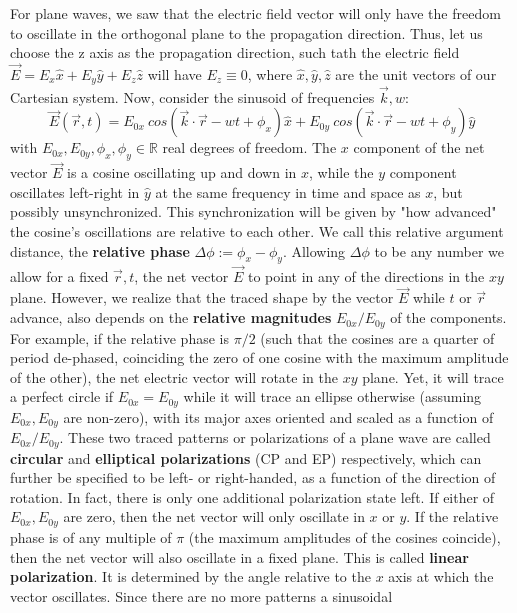 \documentclass[11pt, a4paper, twoside]{article} %
\newcommand{\R}{\mathbb{R}} %
\begin{document}
{For plane waves, we saw that the electric field vector will only have the freedom to oscillate in the orthogonal plane to the propagation direction. Thus, let us choose the z axis as the propagation direction, such tath the electric field $\vec{E}=E_x\hat{x}+E_y\hat{y}+E_z\hat{z}$ will have $E_z\equiv  0$, where $\hat{x},\hat{y},\hat{z}$ are the unit vectors of our Cartesian system. Now, consider the sinusoid of frequencies $\vec{k},w$:
\begin{equation}
\vec{E}(\vec{r},t)=E_{0x}\ cos(\vec{k}\cdot\vec{r}-wt+\phi_x)\hat{x}+ E_{0y}\ cos(\vec{k}\cdot\vec{r}-wt+\phi_y)\hat{y}
\end{equation} 
with $E_{0x},E_{0y},\phi_x,\phi_y\in\R$ real degrees of freedom. The $x$ component of the net vector $\vec{E}$ is a cosine oscillating up and down in $\hat{x}$, while the $y$ component oscillates left-right in $\hat{y}$ at the same frequency in time and space as $x$, but possibly unsynchronized. This synchronization will be given by "how advanced" the cosine's oscillations are relative to each other. We call this relative argument distance, the {\bf relative phase} $\Delta \phi:=\phi_x-\phi_y$. Allowing $\Delta \phi$ to be any number we allow for a fixed $\vec{r},t$, the net vector $\vec{E}$ to point in any of the directions in the $xy$ plane. However, we realize that the traced shape by the vector $\vec{E}$ while $t$ or $\vec{r}$ advance, also depends on the {\bf relative magnitudes} $E_{0x}/E_{0y}$ of the components. For example, if the relative phase is $\pi/2$ (such that the cosines are a quarter of period de-phased, coinciding the zero of one cosine with the maximum amplitude of the other), the net electric vector will rotate in the $xy$ plane. Yet, it will trace a perfect circle if $E_{0x}=E_{0y}$ while it will trace an ellipse otherwise (assuming $E_{0x},E_{0y}$ are non-zero), with its major axes oriented and scaled as a function of $E_{0x}/E_{0y}$. These two traced patterns or polarizations of a plane wave are called {\bf circular} and {\bf elliptical polarizations} (CP and EP) respectively, which can further be specified to be left- or right-handed, as a function of the direction of rotation. In fact, there is only one additional polarization state left. If either of $E_{0x},E_{0y}$ are zero, then the net vector will only oscillate in $x$ or $y$. If the relative phase is of any multiple of $\pi$ (the maximum amplitudes of the cosines coincide), then the net vector will also oscillate in a fixed plane. This is called {\bf linear polarization}. It is determined by the angle relative to the $x$ axis at which the vector oscillates. Since there are no more patterns a sinusoidal  }
\end{document}
